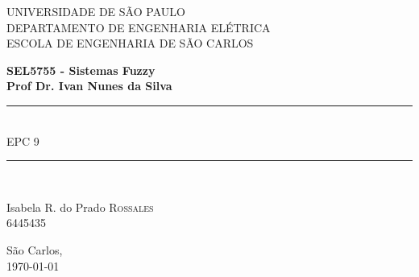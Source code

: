 \documentclass{report}
\begin{document}
\newcommand{\HRule}{\rule{\linewidth}{0.5mm}}
\newcommand{\tsize}[1]{(\frac{W}{L})_{#1}}
 

\begin{titlepage}

\begin{center}


{\LARGE UNIVERSIDADE DE SÃO PAULO\\}
{\LARGE DEPARTAMENTO DE ENGENHARIA ELÉTRICA \\}
{\LARGE ESCOLA DE ENGENHARIA DE SÃO CARLOS\\[4cm]}

\textbf{\large SEL5755 - Sistemas Fuzzy}\\[1cm]
\textbf{\large Prof Dr. Ivan Nunes da Silva}\\[2cm]


\HRule \\[0.6cm]
{ \huge EPC 9\bfseries }\\[0.6cm]

\HRule \\[2cm]


\begin{center} \large
\end{center}

\begin{minipage}{\textwidth}
\begin{flushleft} \large
Isabela R. do Prado \textsc{Rossales}\\
6445435
\end{flushleft}
\end{minipage}

\vfill

{\large São Carlos,\\ \today}

\end{center}

\end{titlepage}


\newpage



\end{document}
